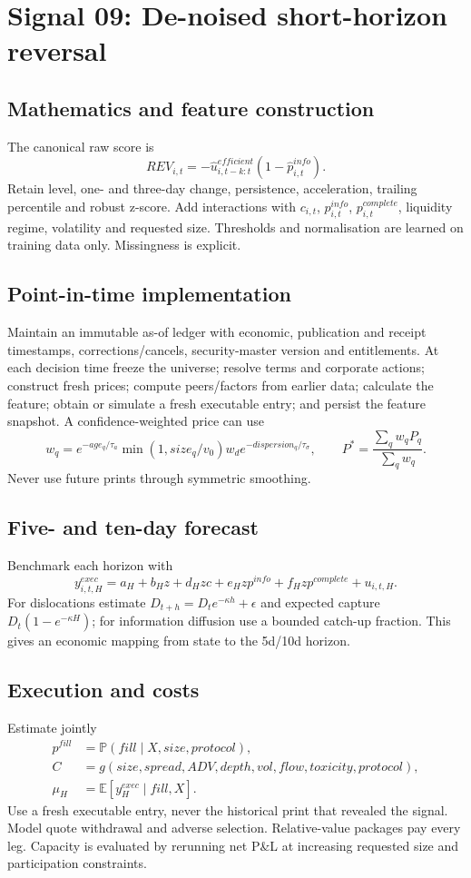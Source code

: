 \documentclass[10pt]{article}
\newcommand{\E}{\mathbb{E}}\newcommand{\Pp}{\mathbb{P}}
\begin{document}
\section{Signal 09: De-noised short-horizon reversal}
\subsection{Mathematics and feature construction}
The canonical raw score is
\begin{equation}REV_{i,t}=-\widehat u^{efficient}_{i,t-k:t}(1-\widehat p^{info}_{i,t}).\end{equation}
Retain level, one- and three-day change, persistence, acceleration, trailing percentile and robust z-score. Add interactions with $c_{i,t}$, $p^{info}_{i,t}$, $p^{complete}_{i,t}$, liquidity regime, volatility and requested size. Thresholds and normalisation are learned on training data only. Missingness is explicit.

\subsection{Point-in-time implementation}
Maintain an immutable as-of ledger with economic, publication and receipt timestamps, corrections/cancels, security-master version and entitlements. At each decision time freeze the universe; resolve terms and corporate actions; construct fresh prices; compute peers/factors from earlier data; calculate the feature; obtain or simulate a fresh executable entry; and persist the feature snapshot. A confidence-weighted price can use
\[w_q=e^{-age_q/\tau_a}\min(1,size_q/v_0)w_d e^{-dispersion_q/\tau_\sigma},\qquad P^*=\frac{\sum_qw_qP_q}{\sum_qw_q}.\]
Never use future prints through symmetric smoothing.

\subsection{Five- and ten-day forecast}
Benchmark each horizon with
\[y^{exec}_{i,t,H}=a_H+b_Hz+d_Hzc+e_Hzp^{info}+f_Hzp^{complete}+u_{i,t,H}.\]
For dislocations estimate $D_{t+h}=D_te^{-\kappa h}+\epsilon$ and expected capture $D_t(1-e^{-\kappa H})$; for information diffusion use a bounded catch-up fraction. This gives an economic mapping from state to the 5d/10d horizon.

\subsection{Execution and costs}
Estimate jointly
\begin{align}
p^{fill}&=\Pp(fill\mid X,size,protocol),\\
C&=g(size,spread,ADV,depth,vol,flow,toxicity,protocol),\\
\mu_H&=\E[y^{exec}_H\mid fill,X].
\end{align}
Use a fresh executable entry, never the historical print that revealed the signal. Model quote withdrawal and adverse selection. Relative-value packages pay every leg. Capacity is evaluated by rerunning net P\&L at increasing requested size and participation constraints.
\end{document}

